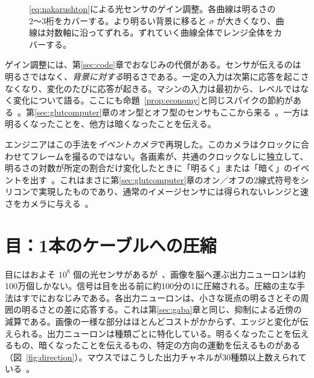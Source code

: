 \begin{figure}[t]
\centering
{}
\caption{\eqref{eq:nakarushton}による光センサのゲイン調整。各曲線は明るさの2〜3桁をカバーする。より明るい背景に移ると $\sigma$ が大きくなり、曲線は対数軸に沿ってずれる。ずれていく曲線全体でレンジ全体をカバーする。}
\label{fig:adaptation}
\end{figure}

ゲイン調整には、第\ref{sec:code}章でおなじみの代償がある。センサが伝えるのは明るさではなく、\emph{背景に対する}明るさである。一定の入力は次第に応答を起こさなくなり、変化のたびに応答が起きる。マシンの入力は最初から、レベルではなく変化について語る。ここにも命題~\ref{prop:economy}と同じスパイクの節約がある~\cite{Barlow1961}。第\ref{sec:glutcomputer}章のオン型とオフ型のセンサもここから来る~\cite{Schiller1992}。一方は明るくなったことを、他方は暗くなったことを伝える。

エンジニアはこの手法を\emph{イベントカメラ}で再現した。このカメラはクロックに合わせてフレームを撮るのではない。各画素が、共通のクロックなしに独立して、明るさの対数が所定の割合だけ変化したときに「明るく」または「暗く」のイベントを出す~\cite{Lichtsteiner2008}。これはまさに第\ref{sec:glutcomputer}章のオン／オフの2線式符号をシリコンで実現したものであり、通常のイメージセンサには得られないレンジと速さをカメラに与える~\cite{Gallego2022}。

\section{目：1本のケーブルへの圧縮}

目にはおよそ $10^8$ 個の光センサがあるが~\cite{Curcio1990}、画像を脳へ運ぶ出力ニューロンは約100万個しかない。信号は目を出る前に約100分の1に圧縮される。圧縮の主な手法はすでにおなじみである。各出力ニューロンは、小さな斑点の明るさとその周囲の明るさとの差に応答する。これは第\ref{sec:gaba}章と同じ、抑制による近傍の減算である。画像の一様な部分はほとんどコストがかからず、エッジと変化が伝えられる。出力ニューロンは種類ごとに特化している。明るくなったことを伝えるもの、暗くなったことを伝えるもの、特定の方向の運動を伝えるものがある（図~\ref{fig:direction}）。マウスではこうした出力チャネルが30種類以上数えられている~\cite{Baden2016}。

